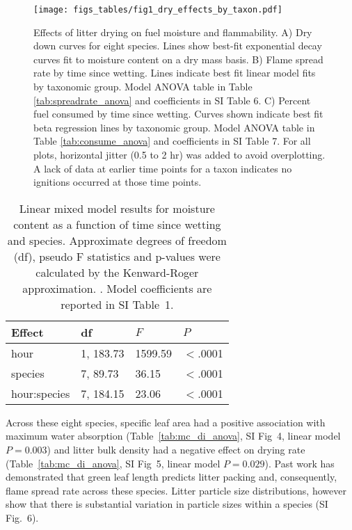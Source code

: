 \documentclass[letterpaper,12pt]{article}
\begin{document}
\begin{figure}
  \centering
  \texttt{[image: figs\_tables/fig1\_dry\_effects\_by\_taxon.pdf]}
  \caption{}
\end{figure}
\begin{figure}
  \captionsetup{labelformat=adja-page}
  \ContinuedFloat
\caption{Effects of litter drying on fuel moisture and flammability. A) Dry
  down curves for eight species. Lines show best-fit exponential decay curves
  fit to moisture content on a dry mass basis. B) Flame spread rate by time
  since wetting. Lines indicate best fit linear model fits by taxonomic group.
  Model ANOVA table in Table \ref{tab:spreadrate_anova} and coefficients in SI
  Table 6. C) Percent fuel consumed by time since wetting. Curves shown
  indicate best fit beta regression lines by taxonomic group. Model ANOVA table
  in Table \ref{tab:consume_anova} and coefficients in SI Table 7. For all
  plots, horizontal jitter (0.5 to 2 hr) was added to avoid overplotting. A
  lack of data at earlier time points for a taxon indicates no ignitions
  occurred at those time points. }
 \label{fig:drydown}
\end{figure}

\begin{table}
  \caption{Linear mixed model results for moisture content as a function of
    time since wetting and species. Approximate degrees of freedom (df), pseudo F
    statistics and p-values were calculated by the Kenward-Roger approximation.
    \citep{Kenward_Roger-1997}. Model coefficients are reported in SI Table~1.}
  \label{tab:drydown}
\centering
\begin{tabular}{llll}
  \toprule
Effect & df & $F$ & $P$ \\ 
  \midrule
  hour & 1, 183.73 & 1599.59 & $<$.0001 \\ 
  species & 7, 89.73 & 36.15 & $<$.0001 \\ 
  hour:species & 7, 184.15 & 23.06 & $<$.0001 \\ 
   \bottomrule
\end{tabular}
\end{table}

Across these eight species, specific leaf area had a positive association with
maximum water absorption (Table~\ref{tab:mc_di_anova}, SI Fig~4, linear model
$P = 0.003$) and litter bulk density had a negative effect on drying rate
(Table~\ref{tab:mc_di_anova}, SI Fig~5, linear model $P = 0.029$). Past work
has demonstrated that green leaf length predicts litter packing and,
consequently, flame spread rate across these species. Litter particle size
distributions, however show that there is substantial variation in particle
sizes within a species (SI Fig.~6).
\end{document}
